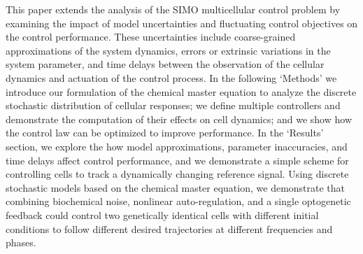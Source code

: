 \documentclass[12pt]{iopart}
\begin{document}

This paper extends the analysis of the SIMO multicellular control problem by examining the impact of model uncertainties and fluctuating control objectives on the control performance. 
These uncertainties include coarse-grained approximations of the system dynamics, errors or extrinsic variations in the system parameter, and time delays between the observation of the cellular dynamics and actuation of the control process. 
In the following `Methods' we introduce our formulation of the chemical master equation to analyze the discrete stochastic distribution of cellular responses; we define multiple controllers and demonstrate the computation of their effects on cell dynamics; and we show how the control law can be optimized to improve performance.
In the `Results' section, we explore the how model approximations, parameter inaccuracies, and time delays affect control performance, and we demonstrate a simple scheme for controlling cells to track a dynamically changing reference signal. 
Using discrete stochastic models based on the chemical master equation, we demonstrate that combining biochemical noise, nonlinear auto-regulation, and a single optogenetic feedback could control two genetically identical cells with different initial conditions to follow different desired trajectories at different frequencies and phases. 

\end{document}

